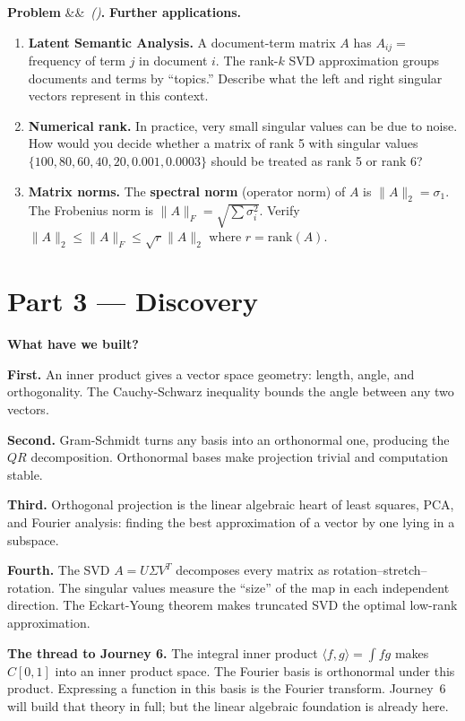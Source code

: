 \documentclass[12pt,a4paper]{article}
\newcounter{problem}
\newenvironment{problem}[1][]{\refstepcounter{problem}\par\vspace{6pt}\noindent\textbf{\color{MidBlue}Problem \theproblem}\ifx&#1&\else\ \textit{(#1)}\fi\textbf{.}\enskip}{\par\vspace{4pt}}
\begin{document}
\begin{problem}
\textbf{Further applications.}
\begin{enumerate}[label=(\alph*),topsep=2pt]
  \item \textbf{Latent Semantic Analysis.} A document-term matrix $A$ has $A_{ij}=$ frequency of term $j$ in document $i$. The rank-$k$ SVD approximation groups documents and terms by ``topics.'' Describe what the left and right singular vectors represent in this context.
  \item \textbf{Numerical rank.} In practice, very small singular values can be due to noise. How would you decide whether a matrix of rank 5 with singular values $\{100, 80, 60, 40, 20, 0.001, 0.0003\}$ should be treated as rank 5 or rank 6?
  \item \textbf{Matrix norms.} The \textbf{spectral norm} (operator norm) of $A$ is $\|A\|_2 = \sigma_1$. The Frobenius norm is $\|A\|_F = \sqrt{\sum\sigma_i^2}$. Verify $\|A\|_2 \leq \|A\|_F \leq \sqrt{r}\|A\|_2$ where $r=\text{rank}(A)$.
\end{enumerate}
\end{problem}

\section{Part 3 \texorpdfstring{---}{--} Discovery}

\begin{discoverybox}
\textbf{What have we built?}

\textbf{First.} An inner product gives a vector space geometry: length, angle, and orthogonality. The Cauchy-Schwarz inequality bounds the angle between any two vectors.

\textbf{Second.} Gram-Schmidt turns any basis into an orthonormal one, producing the $QR$ decomposition. Orthonormal bases make projection trivial and computation stable.

\textbf{Third.} Orthogonal projection is the linear algebraic heart of least squares, PCA, and Fourier analysis: finding the best approximation of a vector by one lying in a subspace.

\textbf{Fourth.} The SVD $A = U\Sigma V^T$ decomposes every matrix as rotation--stretch--rotation. The singular values measure the ``size'' of the map in each independent direction. The Eckart-Young theorem makes truncated SVD the optimal low-rank approximation.

\medskip
\textbf{The thread to Journey 6.} The integral inner product $\langle f,g\rangle = \int fg$ makes $C[0,1]$ into an inner product space. The Fourier basis is orthonormal under this product. Expressing a function in this basis is the Fourier transform. Journey~6 will build that theory in full; but the linear algebraic foundation is already here.
\end{discoverybox}
\end{document}

